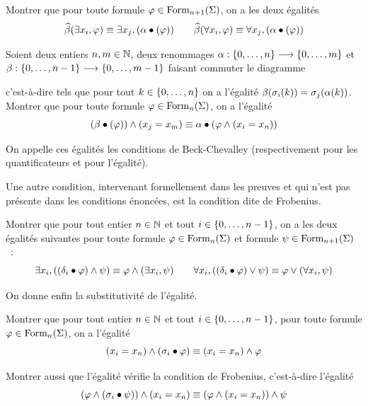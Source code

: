 \begin{problem}
\begin{pbQuest}
    Montrer que pour toute formule $\varphi\in\operatorname{Form}_{n+1}(\Sigma)$, on a les
    deux égalités
    \[\widehat{\beta}(\exists x_i, \varphi) \equiv
    \exists x_j,(\alpha\mathbin{\bullet}(\varphi))\qquad
    \widehat{\beta}(\forall x_i, \varphi) \equiv
    \forall x_j,(\alpha\mathbin{\bullet}(\varphi))\]
  \item Soient deux entiers $n,m\in\mathbb N$, deux renommages
    $\alpha : \displaystyle \{0,\ldots,n\} \longrightarrow \{0,\ldots,m\}$ et
    $\beta : \displaystyle \{0,\ldots,n - 1\} \longrightarrow \{0,\ldots,m - 1\}$ faisant
    commuter le diagramme
    \begin{center}
    \end{center}
    c'est-à-dire tels que pour tout $k \in \{0,\ldots,n\}$ on a l'égalité
    $\beta(\sigma_i(k)) = \sigma_j(\alpha(k))$.
    Montrer que pour toute formule $\varphi\in\operatorname{Form}_{n}(\Sigma)$, on a
    l'égalité
    \[(\beta\mathbin{\bullet}(\varphi))\land (x_j = x_m) \equiv
    \alpha\mathbin{\bullet}(\varphi\land (x_i = x_n))\]
  \end{pbQuest}
  On appelle ces égalités les conditions de Beck-Chevalley (respectivement pour
  les quantificateurs et pour l'égalité).

  Une autre condition, intervenant formellement dans les preuves et qui n'est
  pas présente dans les conditions énoncées, est la condition dite de Frobenius.
  \begin{pbQuest}[resume]
  \item Montrer que pour tout entier $n \in \mathbb N$ et tout $i\in\{0,\ldots,n - 1\}$,
    on a les deux égalités suivantes pour toute formule
    $\varphi\in\operatorname{Form}_n(\Sigma)$ et formule $\psi\in\operatorname{Form}_{n+1}(\Sigma)$~:
    \[\exists x_i, ((\delta_i\mathbin{\bullet}\varphi)\land \psi) \equiv
    \varphi\land (\exists x_i, \psi)\qquad
    \forall x_i, ((\delta_i\mathbin{\bullet}\varphi) \lor \psi) \equiv
    \varphi\lor (\forall x_i, \psi)\]
  \end{pbQuest}
  On donne enfin la substitutivité de l'égalité.
  \begin{pbQuest}[resume]
  \item Montrer que pour tout entier $n \in \mathbb N$ et tout $i\in\{0,\ldots,n - 1\}$,
    pour toute formule $\varphi\in\operatorname{Form}_{n}(\Sigma)$, on a l'égalité
    \[(x_i = x_n) \land (\sigma_i\mathbin{\bullet}\varphi) \equiv
    (x_i = x_n) \land \varphi\]
  \item Montrer aussi que l'égalité vérifie la condition de Frobenius,
    c'est-à-dire l'égalité
    \[(\varphi\land (\sigma_i\mathbin{\bullet}\psi))\land (x_i = x_n)\equiv
    (\varphi\land (x_i = x_n))\land \psi\]
  \end{pbQuest}


\end{problem}
